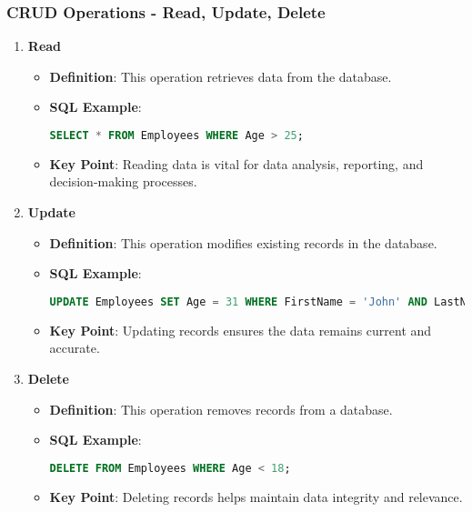 \documentclass[aspectratio=169]{beamer}
\begin{document}
\begin{frame}[fragile]
  \frametitle{CRUD Operations - Read, Update, Delete}
  \begin{enumerate}
    \item \textbf{Read}
    \begin{itemize}
      \item \textbf{Definition}: This operation retrieves data from the database.
      \item \textbf{SQL Example}:
      \begin{lstlisting}[language=SQL]
SELECT * FROM Employees WHERE Age > 25;
      \end{lstlisting}
      \item \textbf{Key Point}: Reading data is vital for data analysis, reporting, and decision-making processes.
    \end{itemize}

    \item \textbf{Update}
    \begin{itemize}
      \item \textbf{Definition}: This operation modifies existing records in the database.
      \item \textbf{SQL Example}:
      \begin{lstlisting}[language=SQL]
UPDATE Employees SET Age = 31 WHERE FirstName = 'John' AND LastName = 'Doe';
      \end{lstlisting}
      \item \textbf{Key Point}: Updating records ensures the data remains current and accurate.
    \end{itemize}

    \item \textbf{Delete}
    \begin{itemize}
      \item \textbf{Definition}: This operation removes records from a database.
      \item \textbf{SQL Example}:
      \begin{lstlisting}[language=SQL]
DELETE FROM Employees WHERE Age < 18;
      \end{lstlisting}
      \item \textbf{Key Point}: Deleting records helps maintain data integrity and relevance.
    \end{itemize}
  \end{enumerate}
\end{frame}
\end{document}

